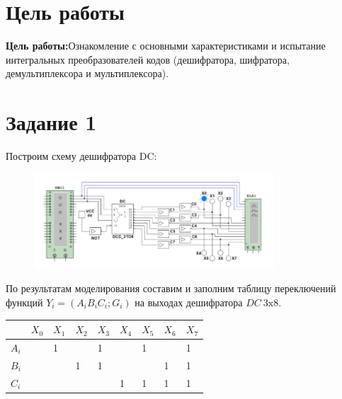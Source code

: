 \documentclass[bachelor, och, labwork]{shiza}
\begin{document}



\tableofcontents

\section{Цель работы}
\textbf{Цель работы:}Ознакомление с основными характеристиками и испытание 
интегральных преобразователей кодов (дешифратора, шифратора, демультиплексора 
и мультиплексора).

\section{Задание 1}
Построим схему дешифратора DC:

\begin{figure}[H]
    \centering
    \includegraphics[width=0.8\textwidth]{pic2/1.png}
    \caption{}
\end{figure}

По результатам моделирования составим и заполним таблицу переключений 
функций $Y_i=(A_iB_iC_i;G_i)$ на выходах дешифратора $DC ~3\text{x}8$.

\begin{table}[h]
    \begin{center}
    \begin{tabular}{|l|l|l|l|l|l|l|l|l|}
    \hline
          & $X_0$ & $X_1$ & $X_2$ & $X_3$ & $X_4$ & $X_5$ & $X_6$ & $X_7$ \\ \hline
    $A_i$ &       & 1     &       & 1     &       & 1     &       & 1     \\ \hline
    $B_i$ &       &       & 1     & 1     &       &       & 1     & 1     \\ \hline
    $C_i$ &       &       &       &       & 1     & 1     & 1     & 1     \\ \hline
    \end{tabular}
\end{center}
\end{table}
\end{document}
